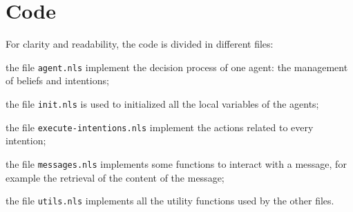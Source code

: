 \section{Code}

For clarity and readability, the code is divided in different files:
\begin{enumerate*}[label=(\roman*)]
\item the file \texttt{agent.nls} implement the decision process of one agent: the management of beliefs and intentions;
\item the file \texttt{init.nls} is used to initialized all the local variables of the agents;
\item the file \texttt{execute-intentions.nls} implement the actions related to every intention;
\item the file \texttt{messages.nls} implements some functions to interact with a message, for example the retrieval of the content of the message;
\item the file \texttt{utils.nls} implements all the utility functions used by the other files.
\end{enumerate*}
